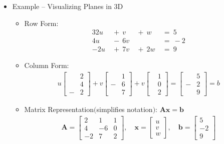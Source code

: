 \documentclass[12pt]{article}
\begin{document}
\begin{itemize}
    \item Example -- Visualizing Planes in 3D
        \begin{itemize}
            \item Row Form:
            \begin{alignat}{3}
                2u\ &{}+\ v\ &{}+\ w\ &=\ 5 \\
                4u\ &{}-\ 6v\ &\phantom{{}+ w} &=\ -2 \\
                -2u\ &{}+\ 7v\ &{}+\ 2w\ &=\ 9
            \end{alignat}
            \item Column Form:
            \begin{align}
                u\begin{bmatrix}
                    &2\\
                    &4\\
                    -&2
                \end{bmatrix}
                + v\begin{bmatrix}
                    &1\\
                    -&6\\
                    &7
                \end{bmatrix}
                + v\begin{bmatrix}
                    &1\\
                    &0\\
                    &2
                \end{bmatrix}
                =
                \begin{bmatrix}
                    &5\\
                    -&2\\
                    &9
                \end{bmatrix}
                = b
            \end{align}
            \item Matrix Representation$($simplifies notation$)$: \(\mathbf{A} \mathbf{x} = \mathbf{b}\)
            \begin{align}
                \mathbf{A} = \begin{bmatrix}
                    2 & 1 & 1 \\
                    4 & -6 & 0 \\
                    -2 & 7 & 2
                \end{bmatrix}, \quad
                \mathbf{x} = \begin{bmatrix}
                    u \\
                    v \\
                    w
                \end{bmatrix}, \quad
                \mathbf{b} = \begin{bmatrix}
                    5 \\
                    -2 \\
                    9
                \end{bmatrix}
            \end{align}
        \end{itemize}
    

\end{itemize}
\end{document}
